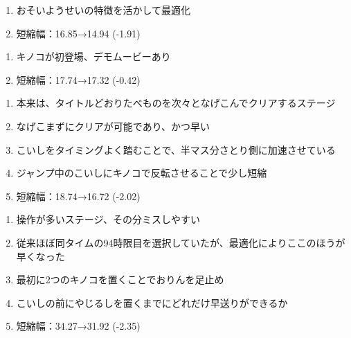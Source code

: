 \begin{enumerate}[label={\sarrow}]
\item おそいようせいの特徴を活かして最適化
\item 短縮幅：16.85→14.94 (-1.91)
\end{enumerate}



\begin{enumerate}[label={\sarrow}]
\item キノコが初登場、デモムービーあり
\item 短縮幅：17.74→17.32 (-0.42)
\end{enumerate}



\begin{enumerate}[label={\sarrow}]
\item 本来は、タイトルどおりたべものを次々となげこんでクリアするステージ
\item なげこまずにクリアが可能であり、かつ早い
\item こいしをタイミングよく踏むことで、半マス分さとり側に加速させている
\item ジャンプ中のこいしにキノコで反転させることで少し短縮
\item 短縮幅：18.74→16.72 (-2.02)
\end{enumerate}



\clearpage
\begin{enumerate}[label={\sarrow}]
\item 操作が多いステージ、その分ミスしやすい
\item 従来ほぼ同タイムの94時限目を選択していたが、最適化によりここのほうが早くなった
\item 最初に2つのキノコを置くことでおりんを足止め
\item こいしの前にやじるしを置くまでにどれだけ早送りができるか
\item 短縮幅：34.27→31.92 (-2.35)
\end{enumerate}



